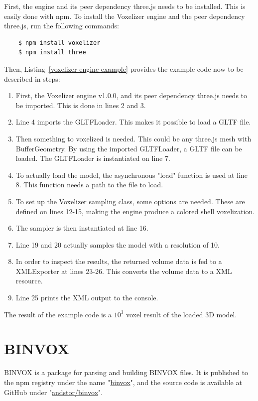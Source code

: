 First, the engine and its peer dependency three.js needs to be installed. This is easily done with npm. To install the Voxelizer engine and the peer dependency three.js, run the following commands:
\begin{verbatim}
    $ npm install voxelizer
    $ npm install three
\end{verbatim}
Then, Listing~\ref{voxelizer-engine-example} provides the example code now to be described in steps: 
\begin{enumerate}
    \item First, the Voxelizer engine v1.0.0, and its peer dependency three.js needs to be imported. This is done in lines 2 and 3.
    \item Line 4 imports the GLTFLoader. This makes it possible to load a GLTF file.
    \item Then something to voxelized is needed. This could be any three.js mesh with BufferGeometry. By using the imported GLTFLoader, a GLTF file can be loaded. The GLTFLoader is instantiated on line 7.
    \item To actually load the model, the asynchronous "load" function is used at line 8. This function needs a path to the file to load.
    \item To set up the Voxelizer sampling class, some options are needed. These are defined on lines 12-15, making the engine produce a colored shell voxelization.
    \item The sampler is then instantiated at line 16.
    \item Line 19 and 20 actually samples the model with a resolution of 10.
    \item In order to inspect the results, the returned volume data is fed to a XMLExporter at lines 23-26. This converts the volume data to a XML resource.
    \item Line 25 prints the XML output to the console.
\end{enumerate}
The result of the example code is a $10^3$ voxel result of the loaded 3D model.


\clearpage

\section{BINVOX}
BINVOX is a package for parsing and building BINVOX files. It is published to the npm registry under the name "\href{https://www.npmjs.com/package/binvox}{binvox}", and the source code is available at GitHub under "\href{https://github.com/andstor/binvox}{andstor/binvox}".

